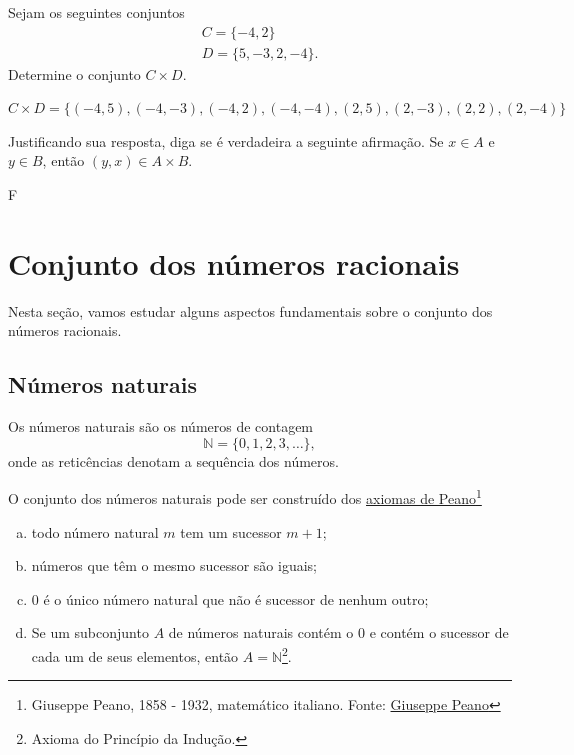 \begin{exer}
  Sejam os seguintes conjuntos
  \begin{gather}
    C = \{-4,2\}\\
    D = \{5,-3,2,-4\}.
  \end{gather}
  Determine o conjunto $C\times D$.
\end{exer}
\begin{resp}
  $C\times D = \{(-4,5),(-4,-3),(-4,2),(-4,-4),(2,5),(2,-3),(2,2),(2,-4)\}$
\end{resp}

\begin{exer}
  Justificando sua resposta, diga se é verdadeira a seguinte afirmação. Se $x\in A$ e $y\in B$, então $(y,x)\in A\times B$.
\end{exer}
\begin{resp}
  F
\end{resp}

\section{Conjunto dos números racionais}\label{cap_numreal_sec_racionais}

Nesta seção, vamos estudar alguns aspectos fundamentais sobre o conjunto dos números racionais.

\subsection{Números naturais}

Os números naturais são os números de contagem
\begin{equation}
  \mathbb{N} = \{0, 1, 2, 3, \ldots\},
\end{equation}
onde as reticências denotam a sequência dos números.

O conjunto dos números naturais pode ser construído dos \href{https://pt.wikipedia.org/wiki/Axiomas\_de\_Peano}{axiomas de Peano}\footnote{Giuseppe Peano, 1858 - 1932, matemático italiano. Fonte: \href{https://pt.wikipedia.org/wiki/Giuseppe\_Peano}{Giuseppe Peano}}
\begin{enumerate}[a)]
\item todo número natural $m$ tem um sucessor $m+1$;
\item números que têm o mesmo sucessor são iguais;
\item $0$ é o único número natural que não é sucessor de nenhum outro;
\item Se um subconjunto $A$ de números naturais contém o $0$ e contém o sucessor de cada um de seus elementos, então $A = \mathbb{N}$\footnote{Axioma do Princípio da Indução.}.
\end{enumerate}

